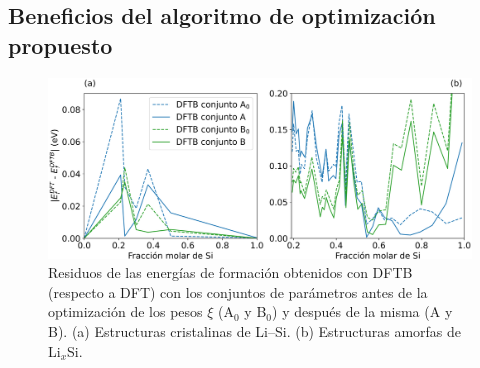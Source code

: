 \subsection{Beneficios del algoritmo de optimización propuesto}

\begin{figure}[h]
    \centering
    \includegraphics[width=\textwidth]{Silicio/modelo/resultados/residuos/residuos.png}
    \caption{Residuos de las energías de formación obtenidos con DFTB (respecto a
    DFT) con los conjuntos de parámetros antes de la optimización de los pesos 
    $\xi$ (A$_0$ y B$_0$) y después de la misma (A y B). (a) Estructuras
    cristalinas de Li--Si. (b) Estructuras amorfas de Li$_x$Si.}
    \label{fig:residuos}
\end{figure}
